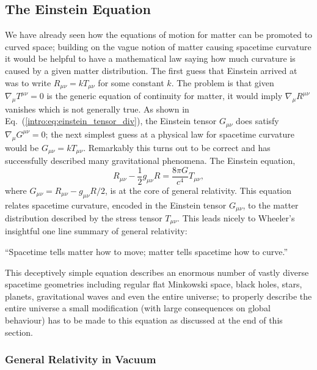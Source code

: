 \subsection{The Einstein Equation}
We have already seen how the equations of motion for matter can be promoted to curved space; building on the vague notion of matter causing spacetime curvature it would be helpful to have a mathematical law saying how much curvature is caused by a given matter distribution. The first guess that Einstein arrived at was to write $R_{\mu\nu}=kT_{\mu\nu}$ for some constant $k$. The problem is that given $\nabla_\mu T^{\mu\nu}=0$ is the generic equation of continuity for matter, it would imply $\nabla_\mu R^{\mu\nu}$ vanishes which is not generally true. As shown in Eq.~(\ref{intro:eq:einstein_tensor_div}), the Einstein tensor $G_{\mu\nu}$ does satisfy $\nabla_\mu G^{\mu\nu}=0$; the next simplest guess at a physical law for spacetime curvature would be $G_{\mu\nu} = k T_{\mu\nu}$. Remarkably this turns out to be correct and has successfully described many gravitational phenomena. The Einstein equation,
\begin{equation}\label{intro:eq:einstein}
R_{\mu\nu} - \frac{1}{2}g_{\mu\nu}R = \frac{8 \pi G}{c^4}T_{\mu\nu},
\end{equation}
where $G_{\mu\nu} = R_{\mu\nu}- g_{\mu\nu}R/2$, is at the core of general relativity. This equation relates spacetime curvature, encoded in the Einstein tensor $G_{\mu\nu}$, to the matter distribution described by the stress tensor $T_{\mu\nu}$. This leads nicely to Wheeler's insightful one line summary of general relativity:

{\it \begin{center}{\enquote{Spacetime tells matter how to move; matter tells spacetime how to curve.}}\end{center} }

This deceptively simple equation describes an enormous number of vastly diverse spacetime geometries including regular flat Minkowski space, black holes, stars, planets, gravitational waves and even the entire universe; to properly describe the entire universe a small modification (with large consequences on global behaviour) has to be made to this equation as discussed at the end of this section.



\subsubsection*{General Relativity in Vacuum}

